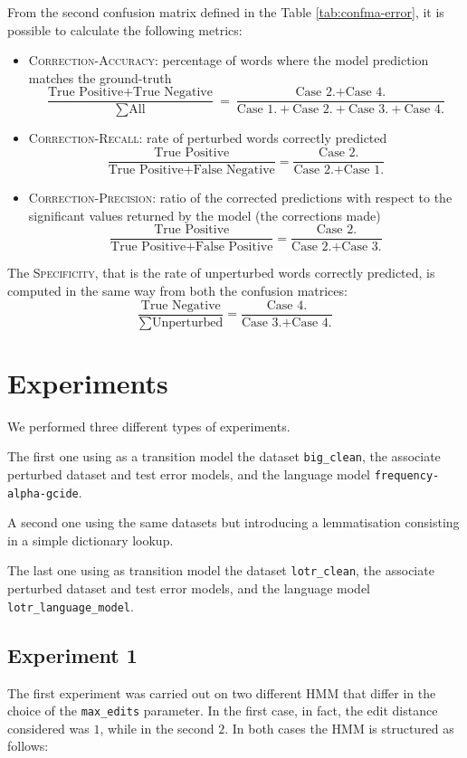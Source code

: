 From the second confusion matrix defined in the Table \ref{tab:confma-error}, it is possible to calculate the following 
metrics:
\begin{itemize}
	\item \textsc{Correction-Accuracy}: percentage of words where the model prediction matches the 
	ground-truth  
	\[ \frac{\mbox{True Positive} + \mbox{True Negative}}{\sum \mbox{All}} = \frac{\mbox{Case 2.} + \mbox{Case 
	4.}}{\mbox{Case 1.} + \mbox{Case 2.} + \mbox{Case 3.} + \mbox{Case 4.}}\]
	\item \textsc{Correction-Recall}: rate of perturbed words correctly predicted
\[ \frac{\mbox{True Positive}}{\mbox{True Positive} + \mbox{False Negative}} = \frac{\mbox{Case 
		2.}}{\mbox{Case 2.} + \mbox{Case 1.}}\]
	\item \textsc{Correction-Precision}: ratio of the corrected predictions with respect to the significant values 
	returned by the 
	model (the corrections made) 
		\[ \frac{\mbox{True Positive}}{\mbox{True Positive} + \mbox{False Positive}} = \frac{\mbox{Case 
		2.}}{\mbox{Case 2.} + \mbox{Case 3.}}\]
\end{itemize}

The \textsc{Specificity}, that is the rate of unperturbed words correctly predicted, is computed in the same way 
from both the confusion matrices:
\[ \frac{\mbox{True Negative}}{\sum \mbox{Unperturbed}} = \frac{\mbox{Case 4.}}{\mbox{Case 3.} + 
	\mbox{Case 4.}}\]

\section{Experiments}
We performed three different types of experiments.

The first one using as a transition model the dataset \texttt{big\_clean}, the associate perturbed dataset and test error 
models, and the language model \texttt{frequency-alpha-gcide}.

A second one using the same datasets but introducing a lemmatisation consisting in a simple dictionary lookup.

The last one using as transition model the dataset \texttt{lotr\_clean}, the associate perturbed dataset and test error 
models, and the language model \texttt{lotr\_language\_model}.\\

\subsection{Experiment 1}
The first experiment was carried out on two different HMM that differ in the choice of the \texttt{max\_edits} 
parameter.
In the first case, in fact, the edit distance considered was $1$, while in the second $2$.
In both cases the HMM is structured as follows:

